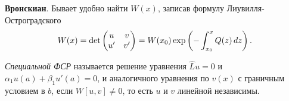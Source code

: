\textbf{Вронскиан}.  Бывает удобно найти $W(x)$, записав формулу Лиувилля-Остроградского
\begin{equation*}
    W(x) = 
    \det \begin{pmatrix}
        u & v  \\
        u' & v'  \\
    \end{pmatrix}
    =
    W(x_0) \exp\left(
        - \int_{x_0}^{x}  Q(z) \, d z
    \right).
\end{equation*}


\begin{to_def}
    \textit{Специальной ФСР} называется решение уравнения $\hat{L} u = 0$ и $\alpha_1 u(a) + \beta_1 u'(a) = 0$, и аналогичного уравнения по $v(x)$ с граничным условием в $b$, 
    если $W[u, v] \neq 0$, то есть $u$ и $v$ линейной независимы. 
\end{to_def}




